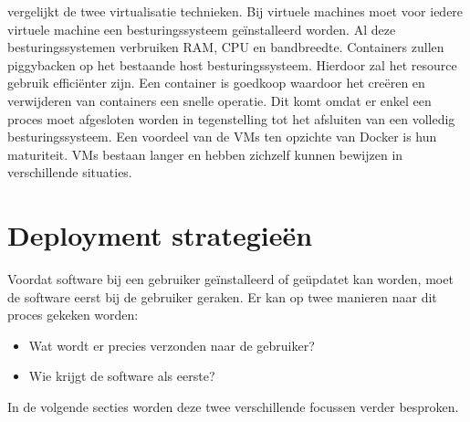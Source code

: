 \citet{merkel2014docker} vergelijkt de twee virtualisatie technieken.
Bij virtuele machines moet voor iedere virtuele machine een besturingssysteem geïnstalleerd worden.
Al deze besturingssystemen verbruiken RAM, CPU en bandbreedte.
Containers zullen piggybacken op het bestaande host besturingssysteem.
Hierdoor zal het resource gebruik efficiënter zijn.
Een container is goedkoop waardoor het creëren en verwijderen van containers een snelle operatie.
Dit komt omdat er enkel een proces moet afgesloten worden in tegenstelling tot het afsluiten van een volledig besturingssysteem.
Een voordeel van de VMs ten opzichte van Docker is hun maturiteit.
VMs bestaan langer en hebben zichzelf kunnen bewijzen in verschillende situaties.

\section{Deployment strategieën}\label{sec:deployment}
Voordat software bij een gebruiker geïnstalleerd of geüpdatet kan worden, moet de software eerst bij de gebruiker geraken.
Er kan op twee manieren naar dit proces gekeken worden:
\begin{itemize}
\item Wat wordt er precies verzonden naar de gebruiker?
\item Wie krijgt de software als eerste?
\end{itemize}
In de volgende secties worden deze twee verschillende focussen verder besproken.

